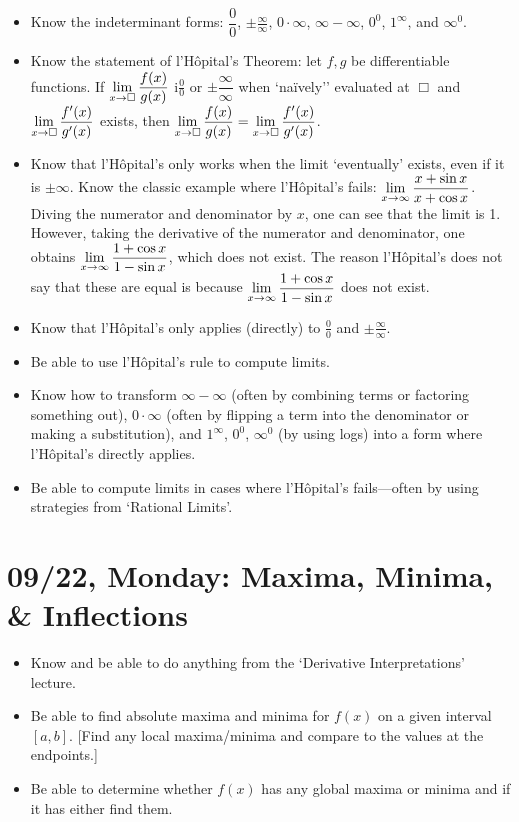 \documentclass[11pt,letterpaper]{article}
\begin{document}
\begin{itemize}
\item Know the indeterminant forms: $\dfrac{0}{0}$, $\pm\frac{\infty}{\infty}$, $0 \cdot \infty$, $\infty - \infty$, $0^0$, $1^\infty$, and $\infty^0$.
\item Know the statement of l'H\^{o}pital's Theorem: let $f, g$ be differentiable functions. If $\displaystyle\lim_{x \to \Box{}} \dfrac{f(x)}{g(x)}$ i$\frac{0}{0}$ or $\pm\dfrac{\infty}{\infty}$ when `na\"ively'' evaluated at $\Box{}$ and $\displaystyle\lim_{x \to \Box{}} \dfrac{f'(x)}{g'(x)}$ exists, then $\displaystyle\lim_{x \to \Box{}} \dfrac{f(x)}{g(x)}= \lim_{x \to \Box{}} \dfrac{f'(x)}{g'(x)}$. 
\item Know that l'H\^{o}pital's only works when the limit `eventually' exists, even if it is $\pm\infty$. Know the classic example where l'H\^{o}pital's fails: $\displaystyle\lim_{x \to \infty} \dfrac{x + \sin x}{x + \cos x}$. Diving the numerator and denominator by $x$, one can see that the limit is 1. However, taking the derivative of the numerator and denominator, one obtains $\displaystyle\lim_{x \to \infty} \dfrac{1 + \cos x}{1 - \sin x}$, which does not exist. The reason l'H\^{o}pital's does not say that these are equal is because $\displaystyle\lim_{x \to \infty} \dfrac{1 + \cos x}{1 - \sin x}$ does not exist. 
\item Know that l'H\^{o}pital's only applies (directly) to $\frac{0}{0}$ and $\pm\frac{\infty}{\infty}$. 
\item Be able to use l'H\^{o}pital's rule to compute limits.
\item Know how to transform $\infty - \infty$ (often by combining terms or factoring something out), $0 \cdot \infty$ (often by flipping a term into the denominator or making a substitution), and $1^\infty$, $0^0$, $\infty^0$ (by using logs) into a form where l'H\^{o}pital's directly applies.
\item Be able to compute limits in cases where l'H\^{o}pital's fails---often by using strategies from `Rational Limits'. 
\end{itemize}

\newpage
\section*{09/22, Monday: Maxima, Minima, \& Inflections\label{09-22}}

\begin{itemize}
\item Know and be able to do anything from the `Derivative Interpretations' lecture.
\item Be able to find absolute maxima and minima for $f(x)$ on a given interval $[a, b]$. [Find any local maxima/minima and compare to the values at the endpoints.]
\item Be able to determine whether $f(x)$ has any global maxima or minima and if it has either find them.
\end{itemize}
\end{document}
